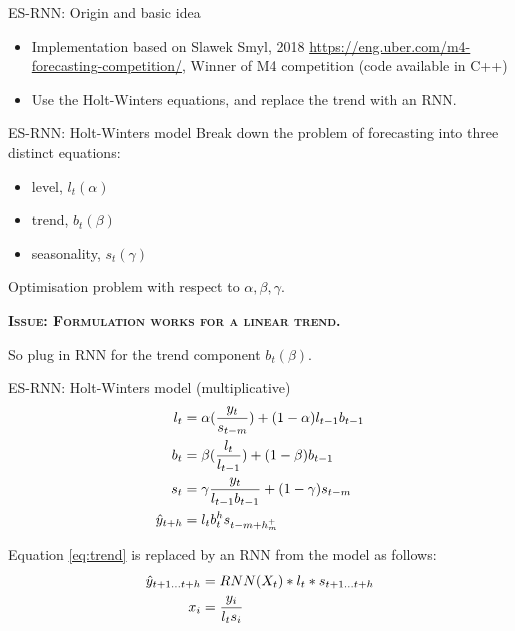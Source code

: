\documentclass[aspectratio=169, 12pt]{beamer}
\begin{document}
\begin{frame}{ES-RNN: Origin and basic idea}
\begin{itemize}
    \item Implementation based on Slawek Smyl\cite{slawek}, 2018
\url{https://eng.uber.com/m4-forecasting-competition/}, Winner of M4 competition\cite{m4} (code available in C++)
    \item Use the Holt-Winters equations\cite{winters}, and replace the trend with an RNN.
\end{itemize}
\end{frame}

\begin{frame}{ES-RNN: Holt-Winters model}
Break down the problem of forecasting into three distinct equations:
\begin{itemize}
    \item level, $l_t (\alpha)$
    \item trend, $b_t (\beta)$
    \item seasonality, $s_{t} (\gamma)$ 
\end{itemize}
Optimisation problem with respect to $\alpha, \beta, \gamma$.
\begin{center}
    \textsc{\textbf{Issue: Formulation works for a linear trend.}}
\end{center}
So plug in RNN for the trend component $b_t (\beta)$.
\end{frame}

\begin{frame}{ES-RNN: Holt-Winters model (multiplicative)}
\begin{align}
    l_t &= \alpha(\frac{y_t}{s_{t-m}}) + (1 - \alpha)l_{t-1} b_{t-1} \label{eq:level}\\
    b_t &= \beta(\frac{l_t}{l_{t-1}}) + (1- \beta) b_{t-1} \label{eq:trend} \\ 
    s_{t} &= \gamma \frac{y_t}{l_{t-1} b_{t-1}} + (1-\gamma)s_{t-m} \label{eq:season}\\
    \Hat{y}_{t+h} &= l_t  b_t^h s_{t-m+h^+_m} \label{eq:predEq}
\end{align}

Equation \ref{eq:trend} is replaced by an RNN from the model as follows:
\begin{align}
    \Hat{y}_{t+1 \dots t+h} &= RNN(X_t) * l_t * s_{t+1 \dots t+h} \label{eq:modifiedEq}\\
    x_i &= \frac{y_i}{l_t s_i} \label{eq:x}
\end{align}
\end{frame}
\end{document}
